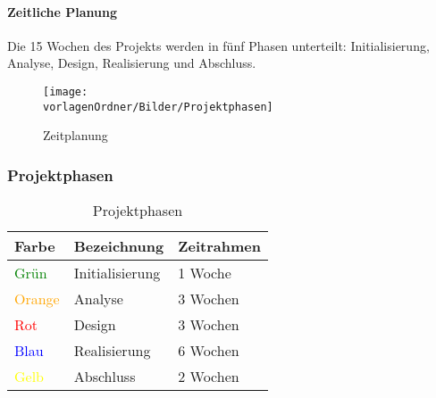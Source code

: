 \documentclass[]{subfiles}
\begin{document}
    \newpage

	\paragraph{Zeitliche Planung}
        Die 15 Wochen des Projekts werden in fünf Phasen unterteilt: 
        Initialisierung, Analyse, Design, Realisierung und Abschluss.\\
		\begin{figure}[!h]
			\begin{center}
				\label{ZeitplanOverview}
				\texttt{[image: \\vorlagenOrdner/Bilder/Projektphasen]}
			\end{center}
			\caption{Zeitplanung}
		\end{figure}

    \subsubsection{Projektphasen}
		\begin{table}[!h]
			\begin{tabularx}{\textwidth}{lll}
				\toprule
				Farbe & Bezeichnung & Zeitrahmen \\
				\midrule
				\textcolor{green}{Grün} & Initialisierung & 1 Woche \\
				\textcolor{orange}{Orange} & Analyse & 3 Wochen \\
				\textcolor{red}{Rot} & Design & 3 Wochen \\
				\textcolor{blue}{Blau} & Realisierung & 6 Wochen \\
				\textcolor{yellow}{Gelb} & Abschluss & 2 Wochen \\
				\bottomrule
			\end{tabularx}
			\caption{Projektphasen}
		\end{table}
\end{document}

